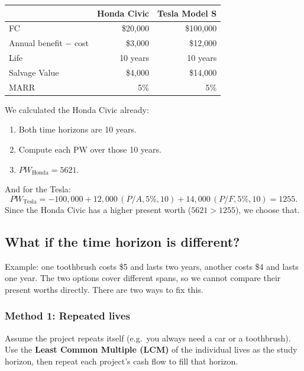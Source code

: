 \documentclass[11pt]{article}
\newcommand{\term}[1]{\textbf{\textcolor{cTerm}{#1}}}
\begin{document}
\begin{center}
\small
\begin{tabular}{lrr}
\toprule
 & \textcolor{cHonda}{\textbf{Honda Civic}} & \textcolor{cTesla}{\textbf{Tesla Model S}}\\
\midrule
FC & \textcolor{cHonda}{\$20{,}000} & \textcolor{cTesla}{\$100{,}000}\\
Annual benefit $-$ cost & \textcolor{cHonda}{\$3{,}000} & \textcolor{cTesla}{\$12{,}000}\\
Life & \textcolor{cHonda}{10 years} & \textcolor{cTesla}{10 years}\\
Salvage Value & \textcolor{cHonda}{\$4{,}000} & \textcolor{cTesla}{\$14{,}000}\\
MARR & \textcolor{cHonda}{5\%} & \textcolor{cTesla}{5\%}\\
\bottomrule
\end{tabular}
\end{center}

We calculated the Honda Civic already:
\begin{enumerate}[nosep]
  \item Both time horizons are 10 years.
  \item Compute each PW over those 10 years.
  \item $PW_{\text{Honda}} = 5621$.
\end{enumerate}
And for the Tesla:
\[
PW_{\text{Tesla}} = -100{,}000 + 12{,}000\,(P/A, 5\%, 10) + 14{,}000\,(P/F, 5\%, 10) = 1255.
\]
Since the Honda Civic has a higher present worth ($5621 > 1255$), we choose that.

\subsection*{What if the time horizon is different?}
Example: one toothbrush costs \$5 and lasts two years, another costs \$4 and
lasts one year. The two options cover different spans, so we cannot compare their
present worths directly. There are two ways to fix this.

\subsubsection*{Method 1: Repeated lives}
Assume the project repeats itself (e.g.\ you always need a car or a toothbrush).
Use the \term{Least Common Multiple (LCM)} of the individual lives as the study
horizon, then repeat each project's cash flow to fill that horizon.
\end{document}
